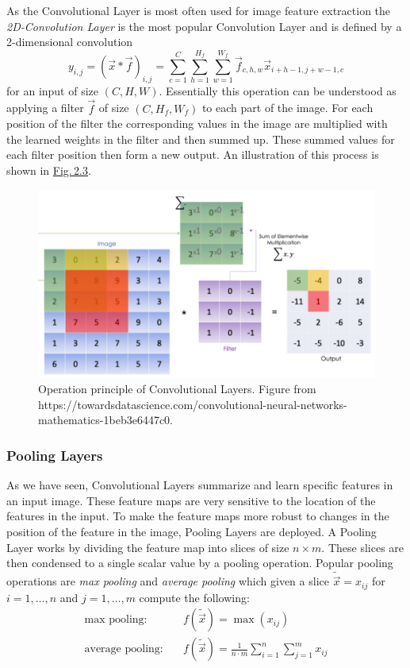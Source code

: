 As the Convolutional Layer is most often used for image feature extraction the \textit{2D-Convolution Layer} is the most popular Convolution Layer and is defined by a 2-dimensional convolution
%
\begin{equation}
    y_{i,j}=(\vec{x}\ast\vec{f})_{i,j}=\sum_{c=1}^{C}\sum_{h=1}^{H_f}\sum_{w=1}^{W_f}\vec{f}_{c,h,w}\vec{x}_{i+h-1,j+w-1,c}
\end{equation}
%
for an input of size $(C,H,W)$. Essentially this operation can be understood as applying a filter $\vec{f}$ of size $(C, H_f, W_f)$ to each part of the image. For each position of the filter the corresponding values in the image are multiplied with the learned weights in the filter and then summed up. These summed values for each filter position then form a new output. An illustration of this process is shown in \hyperref[fig:2.3]{Fig.\,2.3}.
%
\begin{figure} \label{fig:2.3}
    \centering
    \includegraphics[width=.65\textwidth]{Chapters/figures/convolution.PNG}
    \caption[Operation principle of Convolutional Layers]{Operation principle of Convolutional Layers. Figure from\\ https://towardsdatascience.com/convolutional-neural-networks-mathematics-1beb3e6447c0.}
\end{figure}
%
\subsubsection{Pooling Layers}
As we have seen, Convolutional Layers summarize and learn specific features in an input image. These feature maps are very sensitive to the location of the features in the input. To make the feature maps more robust to changes in the position of the feature in the image, Pooling Layers are deployed. A Pooling Layer works by dividing the feature map into slices of size $n\times m$. These slices are then condensed to a single scalar value by a pooling operation. Popular pooling operations are \textit{max pooling} and \textit{average pooling} which given a slice $\tilde{\vec{x}}=x_{ij}$ for $i=1,\dots,n$ and $j=1,\dots,m$ compute the following:
%
\begin{align}
    \text{max pooling:}\quad&f(\tilde{\vec{x}})=\max(x_{ij})\\
    \text{average pooling:}\quad&f(\tilde{\vec{x}})=\frac{1}{n\cdot m}\sum_{i=1}^n\sum_{j=1}^mx_{ij}
\end{align}

